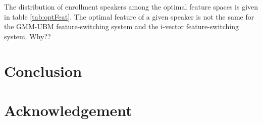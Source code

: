 \documentclass{article}
\begin{document}
%
%



The distribution of enrollment speakers among the optimal feature spaces
is given in table \ref{tab:optFeat}. The optimal feature of a given speaker is
not the same for the GMM-UBM feature-switching system and the i-vector
feature-switching system. Why?? 

\section{Conclusion}
\label{sec:conclude}
\section{Acknowledgement}
\label{sec:ack}


\clearpage 



\end{document}
